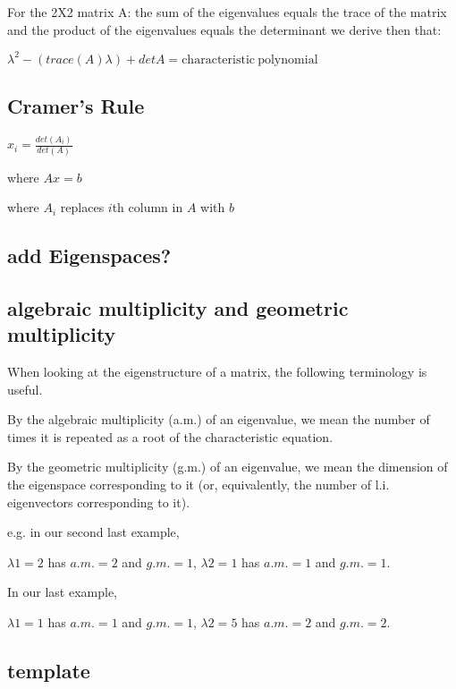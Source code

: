 \documentclass{extarticle}
\begin{document}
\begin{multicols}{2}
For the 2X2 matrix A: the sum of the eigenvalues equals the trace of the matrix and the product of the eigenvalues equals the determinant we derive then that:

$\lambda^2-\left(trace\left(A\right)\lambda\right)+detA=\mathrm{characteristic\ polynomial}$






\subsection{Cramer’s Rule}


$x_i=\frac{det(A_i)}{det (A)}$ 

where $Ax=b$

where $A_i$ replaces $i$th column in $A$ with $b$


\begin{tcolorbox}[enhanced jigsaw,sharp corners,coltext=black,colback=Red!25!white,boxrule=0pt,breakable,size=minimal]
\subsection{add Eigenspaces?}
\end{tcolorbox}


\begin{tcolorbox}[enhanced jigsaw,sharp corners,coltext=black,colback=Red!25!white,boxrule=0pt,breakable,size=minimal]
\subsection{algebraic multiplicity and geometric multiplicity}

When looking at the eigenstructure of a matrix, the following terminology is useful.

By the algebraic multiplicity (a.m.) of an eigenvalue, we mean the number of times it is repeated as a root of the characteristic equation.

By the geometric multiplicity (g.m.) of an eigenvalue, we mean the dimension of the eigenspace corresponding to it (or, equivalently, the number of l.i. eigenvectors corresponding to it).

e.g. in our second last example,

$\lambda1 = 2$ has $a.m.=2$ and $g.m.=1$, $\lambda2 = 1$ has $a.m.=1$ and $g.m.=1$.

In our last example,

$\lambda1 = 1$ has $a.m.=1$ and $g.m.=1$, $\lambda2 = 5$ has $a.m.=2$ and $g.m.=2$.
\end{tcolorbox}




\begin{tcolorbox}[enhanced jigsaw,sharp corners,coltext=black,colback=BurntOrange!25!white,boxrule=0pt,breakable,size=minimal]
\subsection{template}

\end{tcolorbox}





\end{multicols}
\end{document}
